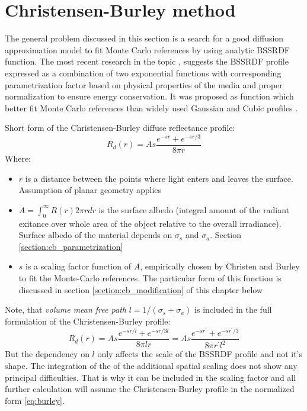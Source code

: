\section{Christensen-Burley method}
The general problem discussed in this section is a search for a good diffusion approximation model
to fit Monte Carlo references by using analytic BSSRDF function. The most recent research in the topic
\cite{Burley:disney_siggraph15}, \cite{Christensen:2015:ARP:2775280.2792555} suggests the
\gls{BSSRDF} profile expressed as a combination of two exponential functions with corresponding
parametrization factor based on physical properties of the media and proper normalization to ensure
energy conservation. It was proposed as function which better fit Monte Carlo references than widely
used Gaussian and Cubic profiles \cite{King:2013:BIS:2504459.2504520}.

Short form of the Christensen-Burley diffuse reflectance profile:
\begin{equation}\label{eq:burley}
R_d(r) = As\dfrac{e^{-sr}+e^{-sr/3}}{8\pi r}
\end{equation}
Where:
\begin{itemize}
    \item{$r$ is a distance between the points where light enters and leaves the surface. Assumption
    of planar geometry applies}
    \item{ $A=\int_0^{\infty} R(r)2\pi rdr$ is the surface albedo (integral
    amount of the radiant exitance over whole area of the object relative to the
    overall irradiance). Surface albedo of the material depends on $\sigma_s$
    and $\sigma_a$. Section \ref{section:cb_parametrization}}
    \item{$s$ is a scaling factor function of $A$, empirically chosen by Christen and Burley
    to fit the Monte-Carlo references. The particular form of this function is discussed in section
    \ref{section:cb_modification} of this chapter below}
\end{itemize}

Note, that \emph{volume mean free path} $l = 1/(\sigma_s + \sigma_a)$ is included in the full
formulation of the Christensen-Burley profile:
\[
R_d(r) = As\frac{e^{-sr/l}+e^{-sr/3l}}{8\pi lr} = As\frac{e^{-sr^\prime}+e^{-sr^\prime/3}}{8\pi
r^\prime l^2}
\]
But the dependency on $l$ only affects the scale of the BSSRDF profile and not it's shape. The
integration of the of the additional spatial scaling does not show any principal difficulties. That
is why it can be included in the scaling factor and all further calculation will assume the
Christensen-Burley profile in the normalized form \ref{eq:burley}.

